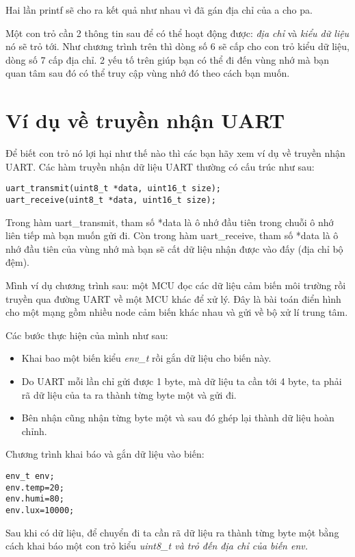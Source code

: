 Hai lần printf sẽ cho ra kết quả như nhau vì đã gán địa chỉ của a cho pa.

Một con trỏ cần 2 thông tin sau để có thể hoạt động được: \textit{địa chỉ} và \textit{kiểu dữ liệu} nó sẽ trỏ tới. Như chương trình trên thì dòng số 6 sẽ cấp cho con trỏ kiểu dữ liệu, dòng số 7 cấp địa chỉ. 2 yếu tố trên giúp bạn có thể đi đến vùng nhớ mà bạn quan tâm sau đó có thể truy cập vùng nhớ đó theo cách bạn muốn.

\section{Ví dụ về truyền nhận UART}

Để biết con trỏ nó lợi hại như thế nào thì các bạn hãy xem ví dụ về truyền nhận UART. Các hàm truyền nhận dữ liệu UART thường có cấu trúc như sau:

\begin{lstlisting}
uart_transmit(uint8_t *data, uint16_t size);
uart_receive(uint8_t *data, uint16_t size);
\end{lstlisting}

Trong hàm uart\_transmit, tham số *data là ô nhớ đầu tiên trong chuỗi ô nhớ liên tiếp mà bạn muốn gửi đi. Còn trong hàm uart\_receive, tham số *data là ô nhớ đầu tiên của vùng nhớ mà bạn sẽ cất dữ liệu nhận được vào đấy (địa chỉ bộ đệm).

Mình ví dụ chương trình sau: một MCU đọc các dữ liệu cảm biến môi trường rồi truyền qua đường UART về một MCU khác để xử lý. Đây là bài toán điển hình cho một mạng gồm nhiều node cảm biến khác nhau và gửi về bộ xử lí trung tâm.

Các bước thực hiện của mình như sau:
\begin{itemize}
    \item Khai bao một biến kiểu \textit{env\_t} rồi gắn dữ liệu cho biến này.
    \item Do UART mỗi lần chỉ gửi được 1 byte, mà dữ liệu ta cần tới 4 byte, ta phải rã dữ liệu của ta ra thành từng byte một và gửi đi.
    \item Bên nhận cũng nhận từng byte một và  sau đó ghép lại thành dữ liệu hoàn chỉnh.
\end{itemize}

Chương trình khai báo và gắn dữ liệu vào biến:
\begin{lstlisting}
env_t env;
env.temp=20;
env.humi=80;
env.lux=10000;
\end{lstlisting}

Sau khi có dữ liệu, để chuyển đi ta cần rã dữ liệu ra thành từng byte một bằng cách khai báo một con trỏ kiểu \it{uint8\_t} và trỏ đến địa chỉ của biến \it{env}.

